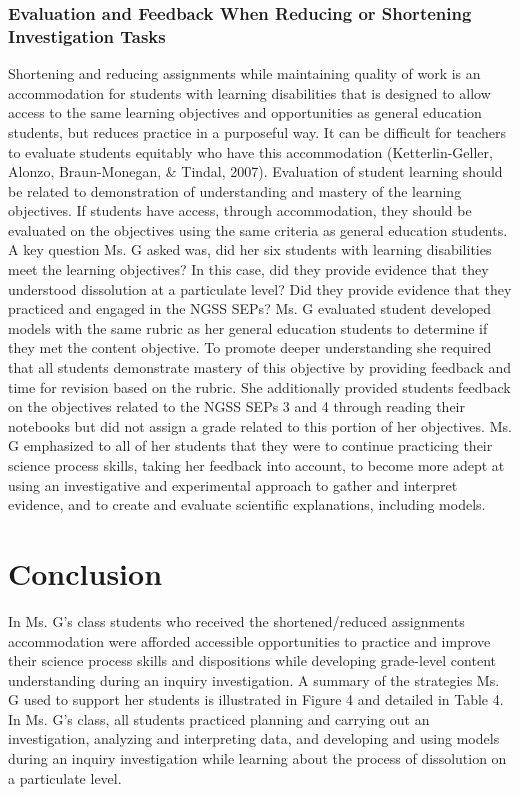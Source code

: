 \documentclass[11pt]{sig-alternate}
\begin{document}
\begin{large}
\subsubsection*{Evaluation and Feedback When Reducing or Shortening Investigation Tasks}
Shortening and reducing assignments while maintaining quality of work is an accommodation for students with learning disabilities that is designed to allow access to the same learning objectives and opportunities as general education students, but reduces practice in a purposeful way. It can be difficult for teachers to evaluate students equitably who have this accommodation (Ketterlin-Geller, Alonzo, Braun-Monegan, \& Tindal, 2007). Evaluation of student learning should be related to demonstration of understanding and mastery of the learning objectives. If students have access, through accommodation, they should be evaluated on the objectives using the same criteria as general education students. A key question Ms. G asked was, did her six students with learning disabilities meet the learning objectives? In this case, did they provide evidence that they understood dissolution at a particulate level? Did they provide evidence that they practiced and engaged in the NGSS SEPs? Ms. G evaluated student developed models with the same rubric as her general education students to determine if they met the content objective. To promote deeper understanding she required that all students demonstrate mastery of this objective by providing feedback and time for revision based on the rubric. She additionally provided students feedback on the objectives related to the NGSS SEPs 3 and 4 through reading their notebooks but did not assign a grade related to this portion of her objectives. Ms. G emphasized to all of her students that they were to continue practicing their science process skills, taking her feedback into account, to become more adept at using an investigative and experimental approach to gather and interpret evidence, and to create and evaluate scientific explanations, including models. 

\section*{Conclusion}
In Ms. G’s class students who received the shortened/reduced assignments accommodation were afforded accessible opportunities to practice and improve their science process skills and dispositions while developing grade-level content understanding during an inquiry investigation. A summary of the strategies Ms. G used to support her students is illustrated in Figure 4 and detailed in Table 4. In Ms. G’s class, all students practiced planning and carrying out an investigation, analyzing and interpreting data, and developing and using models during an inquiry investigation while learning about the process of dissolution on a particulate level. 


\end{large}
\end{document}
